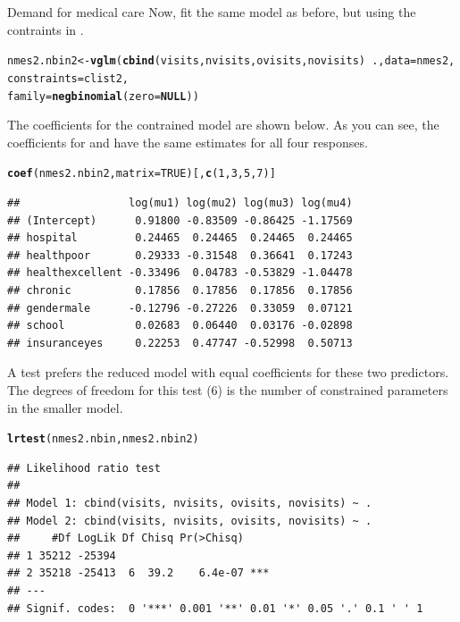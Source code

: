 \documentclass[11pt]{book}\usepackage[]{graphicx}\usepackage[]{color}
\makeatletter
\newcommand{\hlnum}[1]{\textcolor[rgb]{0.686,0.059,0.569}{#1}}%
\newcommand{\hlopt}[1]{\textcolor[rgb]{0,0,0}{#1}}%
\newcommand{\hlstd}[1]{\textcolor[rgb]{0.345,0.345,0.345}{#1}}%
\newcommand{\hlkwa}[1]{\textcolor[rgb]{0.161,0.373,0.58}{\textbf{#1}}}%
\newcommand{\hlkwb}[1]{\textcolor[rgb]{0.69,0.353,0.396}{#1}}%
\newcommand{\hlkwc}[1]{\textcolor[rgb]{0.333,0.667,0.333}{#1}}%
\newcommand{\hlkwd}[1]{\textcolor[rgb]{0.737,0.353,0.396}{\textbf{#1}}}%
\newenvironment{kframe}{%
 \def\at@end@of@kframe{}%
 \ifinner\ifhmode%
  \def\at@end@of@kframe{\end{minipage}}%
  \begin{minipage}{\columnwidth}%
 \fi\fi%
 \def\FrameCommand##1{\hskip\@totalleftmargin \hskip-\fboxsep
 \colorbox{shadecolor}{##1}\hskip-\fboxsep
     \hskip-\linewidth \hskip-\@totalleftmargin \hskip\columnwidth}%
 \MakeFramed {\advance\hsize-\width
   \@totalleftmargin\z@ \linewidth\hsize
   \@setminipage}}%
 {\par\unskip\endMakeFramed%
 \at@end@of@kframe}
\newenvironment{knitrout}{}{} %
\renewenvironment{knitrout}{\small\renewcommand{\baselinestretch}{.85}}{} %
\makeatother
\begin{document}
\begin{Example}[nmes5]{Demand for medical care}
Now, fit the same model as before, but using the contraints in .
\begin{knitrout}
\color{fgcolor}\begin{kframe}
\begin{alltt}
\hlstd{nmes2.nbin2} \hlkwb{<-} \hlkwd{vglm}\hlstd{(}\hlkwd{cbind}\hlstd{(visits, nvisits, ovisits, novisits)} \hlopt{~} \hlstd{.,} \hlkwc{data} \hlstd{= nmes2,}
                    \hlkwc{constraints} \hlstd{= clist2,}
                    \hlkwc{family} \hlstd{=} \hlkwd{negbinomial}\hlstd{(}\hlkwc{zero} \hlstd{=} \hlkwa{NULL}\hlstd{))}
\end{alltt}
\end{kframe}
\end{knitrout}

The coefficients for the contrained model are shown below.  As you can see, the coefficients for
 and  have the same estimates for all four responses.
\begin{knitrout}
\color{fgcolor}\begin{kframe}
\begin{alltt}
\hlkwd{coef}\hlstd{(nmes2.nbin2,} \hlkwc{matrix}\hlstd{=}\hlnum{TRUE}\hlstd{)[,}\hlkwd{c}\hlstd{(}\hlnum{1}\hlstd{,}\hlnum{3}\hlstd{,}\hlnum{5}\hlstd{,}\hlnum{7}\hlstd{)]}
\end{alltt}
\begin{verbatim}
##                 log(mu1) log(mu2) log(mu3) log(mu4)
## (Intercept)      0.91800 -0.83509 -0.86425 -1.17569
## hospital         0.24465  0.24465  0.24465  0.24465
## healthpoor       0.29333 -0.31548  0.36641  0.17243
## healthexcellent -0.33496  0.04783 -0.53829 -1.04478
## chronic          0.17856  0.17856  0.17856  0.17856
## gendermale      -0.12796 -0.27226  0.33059  0.07121
## school           0.02683  0.06440  0.03176 -0.02898
## insuranceyes     0.22253  0.47747 -0.52998  0.50713
\end{verbatim}
\end{kframe}
\end{knitrout}
A \LR test prefers the reduced model with equal coefficients for these two predictors. The degrees of freedom
for this test (6) is the number of constrained parameters in the smaller model.
\begin{knitrout}
\color{fgcolor}\begin{kframe}
\begin{alltt}
\hlkwd{lrtest}\hlstd{(nmes2.nbin, nmes2.nbin2)}
\end{alltt}
\begin{verbatim}
## Likelihood ratio test
## 
## Model 1: cbind(visits, nvisits, ovisits, novisits) ~ .
## Model 2: cbind(visits, nvisits, ovisits, novisits) ~ .
##     #Df LogLik Df Chisq Pr(>Chisq)    
## 1 35212 -25394                        
## 2 35218 -25413  6  39.2    6.4e-07 ***
## ---
## Signif. codes:  0 '***' 0.001 '**' 0.01 '*' 0.05 '.' 0.1 ' ' 1
\end{verbatim}
\end{kframe}
\end{knitrout}


\end{Example}
\end{document}
